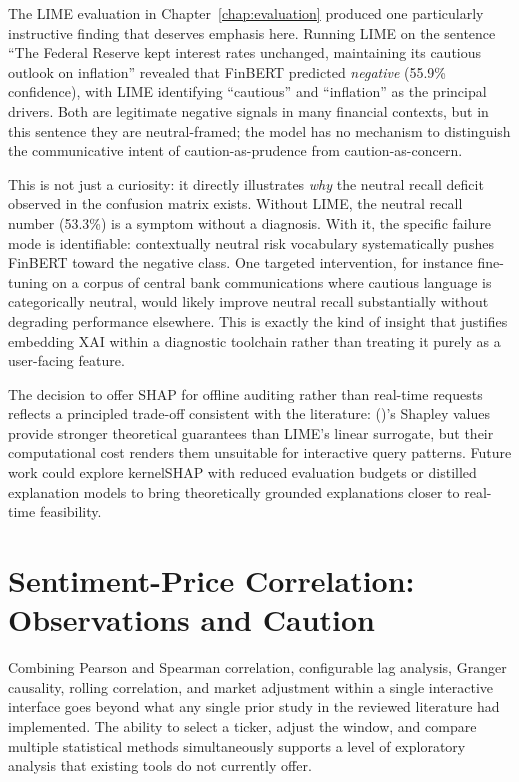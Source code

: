 The LIME evaluation in Chapter~\ref{chap:evaluation} produced one particularly instructive finding that deserves emphasis here.  Running LIME on the sentence ``The Federal Reserve kept interest rates unchanged, maintaining its cautious outlook on inflation'' revealed that FinBERT predicted \textit{negative} (55.9\% confidence), with LIME identifying ``cautious'' and ``inflation'' as the principal drivers.  Both are legitimate negative signals in many financial contexts, but in this sentence they are neutral-framed; the model has no mechanism to distinguish the communicative intent of caution-as-prudence from caution-as-concern.

This is not just a curiosity: it directly illustrates \textit{why} the neutral recall deficit observed in the confusion matrix exists.  Without LIME, the neutral recall number (53.3\%) is a symptom without a diagnosis.  With it, the specific failure mode is identifiable: contextually neutral risk vocabulary systematically pushes FinBERT toward the negative class.  One targeted intervention, for instance fine-tuning on a corpus of central bank communications where cautious language is categorically neutral, would likely improve neutral recall substantially without degrading performance elsewhere.  This is exactly the kind of insight that justifies embedding XAI within a diagnostic toolchain rather than treating it purely as a user-facing feature.

The decision to offer SHAP for offline auditing rather than real-time requests reflects a principled trade-off consistent with the literature: \citeauthor{lundberg2017shap} (\citeyear{lundberg2017shap})'s Shapley values provide stronger theoretical guarantees than LIME's linear surrogate, but their computational cost renders them unsuitable for interactive query patterns.  Future work could explore kernelSHAP with reduced evaluation budgets or distilled explanation models to bring theoretically grounded explanations closer to real-time feasibility.

\section{Sentiment-Price Correlation: Observations and Caution}
\label{sec:correlation_discussion}

Combining Pearson and Spearman correlation, configurable lag analysis, Granger causality, rolling correlation, and market adjustment within a single interactive interface goes beyond what any single prior study in the reviewed literature had implemented. The ability to select a ticker, adjust the window, and compare multiple statistical methods simultaneously supports a level of exploratory analysis that existing tools do not currently offer.


